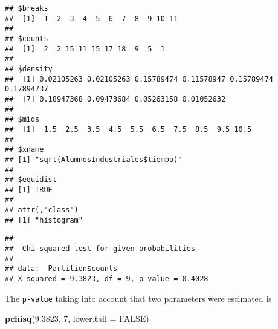 \documentclass[
]{article}
\newenvironment{Shaded}{\begin{snugshade}}{\end{snugshade}}
\newcommand{\AttributeTok}[1]{\textcolor[rgb]{0.13,0.29,0.53}{#1}}
\newcommand{\ConstantTok}[1]{\textcolor[rgb]{0.56,0.35,0.01}{#1}}
\newcommand{\DecValTok}[1]{\textcolor[rgb]{0.00,0.00,0.81}{#1}}
\newcommand{\FloatTok}[1]{\textcolor[rgb]{0.00,0.00,0.81}{#1}}
\newcommand{\FunctionTok}[1]{\textcolor[rgb]{0.13,0.29,0.53}{\textbf{#1}}}
\newcommand{\NormalTok}[1]{#1}
\newcommand{\OtherTok}[1]{\textcolor[rgb]{0.56,0.35,0.01}{#1}}
\newcommand{\SpecialCharTok}[1]{\textcolor[rgb]{0.81,0.36,0.00}{\textbf{#1}}}
\begin{document}
\begin{verbatim}
## $breaks
##  [1]  1  2  3  4  5  6  7  8  9 10 11
## 
## $counts
##  [1]  2  2 15 11 15 17 18  9  5  1
## 
## $density
##  [1] 0.02105263 0.02105263 0.15789474 0.11578947 0.15789474 0.17894737
##  [7] 0.18947368 0.09473684 0.05263158 0.01052632
## 
## $mids
##  [1]  1.5  2.5  3.5  4.5  5.5  6.5  7.5  8.5  9.5 10.5
## 
## $xname
## [1] "sqrt(AlumnosIndustriales$tiempo)"
## 
## $equidist
## [1] TRUE
## 
## attr(,"class")
## [1] "histogram"
\end{verbatim}

\begin{Shaded}
\end{Shaded}

\begin{verbatim}
## 
##  Chi-squared test for given probabilities
## 
## data:  Partition$counts
## X-squared = 9.3823, df = 9, p-value = 0.4028
\end{verbatim}

The \texttt{p-value} taking into account that two parameters were
estimated is

\begin{Shaded}
\begin{Highlighting}[]
\FunctionTok{pchisq}\NormalTok{(}\FloatTok{9.3823}\NormalTok{, }\DecValTok{7}\NormalTok{, }\AttributeTok{lower.tail =} \ConstantTok{FALSE}\NormalTok{)}
\end{Highlighting}
\end{Shaded}
\end{document}
